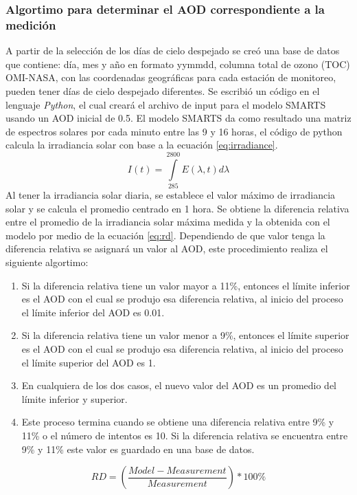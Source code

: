 \subsubsection{Algortimo para determinar el AOD correspondiente a la medición}
A partir de la selección de los días de cielo despejado se creó una base de datos que contiene:
día, mes y año en formato yymmdd, columna total de ozono (TOC) OMI-NASA, con las coordenadas geográficas
para cada estación de monitoreo, pueden tener días de cielo despejado diferentes.
Se escribió un código en el lenguaje \textit{Python}, el cual creará el archivo de input para el modelo SMARTS usando
un AOD inicial de 0.5. El modelo SMARTS da como resultado una matriz de espectros solares por cada  minuto entre las 9 y 16 horas,
el código de python calcula la irradiancia solar con base a la ecuación \ref{eq:irradiance}.
\begin{equation}
        I(t) = \int\limits_{285}^{2800} E(\lambda,t) d\lambda
        \label{eq:irradiance}
\end{equation}
Al tener la irradiancia solar diaria, se establece el valor máximo de irradiancia solar y se calcula el promedio 
centrado en 1 hora. Se obtiene la diferencia relativa entre el promedio de la irradiancia solar máxima medida y
la obtenida con el modelo por medio de la ecuación \ref{eq:rd}. Dependiendo de que valor tenga la diferencia relativa
se asignará un valor al AOD, este procedimiento realiza el siguiente algortimo:
\begin{enumerate}
    \item Si la diferencia relativa tiene un valor mayor a 11\%, entonces el límite inferior es el AOD con el cual se produjo esa diferencia relativa, al inicio del proceso el límite inferior del AOD es 0.01.
    \item Si la diferencia relativa tiene un valor menor a 9\%, entonces el límite superior es el AOD con el cual se produjo esa diferencia relativa, al inicio del proceso el límite superior del AOD es 1.
    \item En cualquiera de los dos casos, el nuevo valor del AOD es un promedio del límite inferior y superior.
    \item Este proceso termina cuando se obtiene una diferencia relativa entre 9\% y 11\% o el número de intentos es 10. Si la diferencia relativa se encuentra entre 9\% y 11\% este valor es guardado en una base de datos.
\end{enumerate}
\begin{equation}
    RD = \left(\frac{Model-Measurement}{Measurement}\right)*100\%
    \label{eq:rd}
\end{equation}